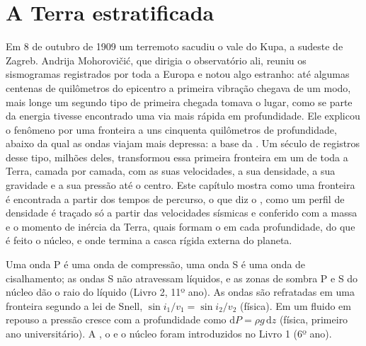 \chapter{A Terra estratificada}\label{ch:b1:layered-earth}

Em 8 de outubro de 1909 um terremoto sacudiu o vale do Kupa, a sudeste de Zagreb.
Andrija Mohorovičić, que dirigia o observatório ali, reuniu os sismogramas registrados por toda a Europa e notou algo estranho: até algumas centenas de quilômetros do epicentro a primeira vibração chegava de um modo, mais longe um segundo tipo de primeira chegada tomava o lugar, como se parte da energia tivesse encontrado uma via mais rápida em profundidade. Ele explicou o fenômeno por uma fronteira a uns cinquenta quilômetros de profundidade, abaixo da qual as ondas viajam mais depressa: a base da . Um século de registros desse tipo, milhões deles, transformou essa primeira fronteira em um  de toda a Terra, camada por camada, com as suas velocidades, a sua densidade, a sua gravidade e a sua pressão até o centro. Este capítulo mostra como uma fronteira é encontrada a partir dos tempos de percurso, o que diz o , como um perfil de densidade é traçado só a partir das velocidades sísmicas e conferido com a massa e o momento de inércia da Terra, quais  formam o  em cada profundidade, do que é feito o núcleo, e onde termina a casca rígida externa do planeta.

\begin{recall}
Uma onda P é uma onda de compressão, uma onda S é uma onda de cisalhamento; as ondas S não atravessam líquidos, e as zonas de sombra P e S do núcleo dão o raio do  líquido (Livro 2, 11º ano). As ondas são refratadas em uma fronteira segundo a lei de Snell, $\sin i_1/v_1 = \sin i_2/v_2$ (física). Em um fluido em repouso a pressão cresce com a profundidade como $\mathrm dP = \rho g\,\mathrm dz$ (física, primeiro ano universitário). A , o  e o núcleo foram introduzidos no Livro 1 (6º ano).
\end{recall}

